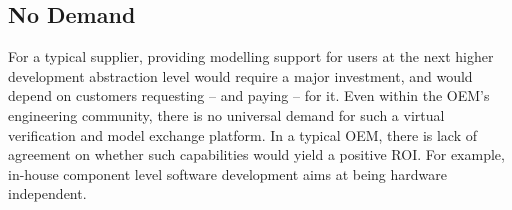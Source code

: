 



\subsection{No Demand}
For a typical supplier,
providing modelling support for users at the next higher development abstraction level would require a major investment,
and would depend on customers requesting -- and paying -- for it.
%
Even within the OEM’s engineering community, there is no universal demand
for such a virtual verification and model exchange platform.
In a typical OEM, there is lack of agreement on whether such capabilities would yield a positive ROI.
For example, in-house component level software development aims at being hardware independent.

